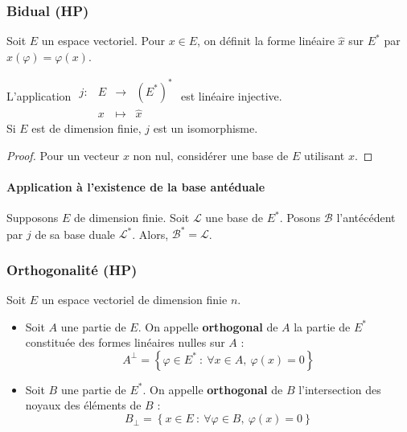 \documentclass[french]{article}
\newcommand{\st}{^*}
\theoremstyle{plain}
\theoremstyle{definition}
\theoremstyle{remark}
\begin{document}
\subsubsection*{Bidual (HP)}

Soit $E$ un espace vectoriel. Pour $x\in E$, on définit la forme linéaire $\hat{x}$ sur $E\st$ par $\hat{x}(\varphi)=\varphi(x)$.

\begin{prop}%
	L'application $\displaystyle\begin{array}{lrcl}
		j:&E&\longrightarrow&(E\st)\st\\
		&x&\longmapsto&\hat{x}
	\end{array}$ est linéaire injective. \\ Si $E$ est de dimension finie, $j$ est un isomorphisme.
\end{prop}
\begin{proof}
	Pour un vecteur $x$ non nul, considérer une base de $E$ utilisant $x$.
\end{proof}

\paragraph{Application à l'existence de la base antéduale} Supposons $E$ de dimension finie. Soit $\mathcal{L}$ une base de $E\st$. Posons $\mathcal{B}$ l'antécédent par $j$ de sa base duale $\mathcal{L}\st$. Alors, $\mathcal{B}\st=\mathcal{L}$.

\subsubsection*{Orthogonalité (HP)}

Soit $E$ un espace vectoriel de dimension finie $n$.

\begin{dfn}
	\begin{itemize}
		\item Soit $A$ une partie de $E$. On appelle \textbf{orthogonal} de $A$ la partie de $E\st$ constituée des formes linéaires nulles sur $A$ : $$A^{\bot}=\left\{\varphi\in E\st\ : \ \forall x\in A,\ \varphi(x)=0\right\}$$
		\item Soit $B$ une partie de $E\st$. On appelle \textbf{orthogonal} de $B$ l'intersection des noyaux des éléments de $B$ : $$B_\bot=\left\{x\in E\ : \ \forall\varphi\in B,\ \varphi(x)=0\right\}$$
	\end{itemize}
\end{dfn}
\end{document}
